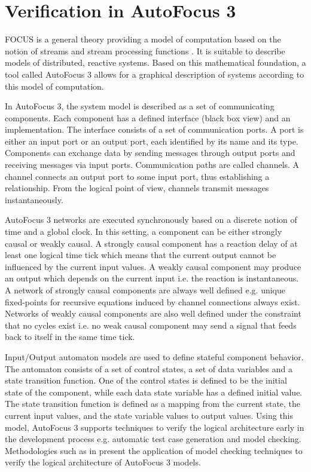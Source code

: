 \section{Verification in AutoFocus 3}

FOCUS is a general theory providing a model of computation based on the notion of streams and stream processing functions \cite{broy2012specification}. It is suitable to describe models of distributed, reactive systems. Based on this mathematical foundation, a tool called AutoFocus 3 \cite{huber1996autofocus} allows for a graphical description of systems according to this model of computation. 

In AutoFocus 3, the system model is described as a set of communicating components. Each component has a defined interface (black box view) and an implementation. The interface consists of a set of communication ports. A port is either an input port or an output port, each identified by its name and its type. Components can exchange data by sending messages through output ports and receiving messages via input ports. Communication paths are called channels. A channel connects an output port to some input port, thus establishing a relationship. From the logical point of view, channels transmit messages instantaneously.

AutoFocus 3 networks are executed synchronously based on a discrete notion of time and a global clock. In this setting, a component can be either strongly causal or weakly causal. A strongly causal component has a reaction delay of at least one logical time tick which means that the current output cannot be influenced by the current input values. A weakly causal component may produce an output which depends on the current input i.e. the reaction is instantaneous. A network of strongly causal components are always well defined e.g. unique fixed-points for recursive equations induced by channel connections always exist. Networks of weakly causal components are also well defined under the constraint that no cycles exist i.e. no weak causal component may send a signal that feeds back to itself in the same time tick. 

Input/Output automaton models are used to define stateful component behavior. The automaton consists of a set of control states, a set of data variables and a state transition function. One of the control states is defined to be the initial state of the component, while each data state variable has a defined initial value. The state transition function is defined as a mapping from the current state, the current input values, and the state variable values to output values. Using this model, AutoFocus 3 supports techniques to verify the logical architecture early in the development process e.g. automatic test case generation and model checking. Methodologies such as in \cite{feilkas2009top} present the application of model checking techniques to verify the logical architecture of AutoFocus 3 models. 

